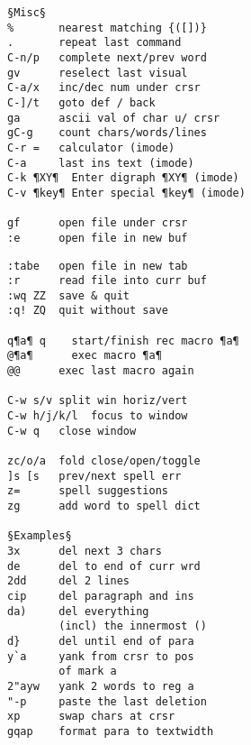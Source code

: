 \documentclass{article}
\begin{document}
\begin{multicols}{4}
\begin{lstlisting}
§Misc§
%       nearest matching {([])}
.       repeat last command
C-n/p   complete next/prev word
gv      reselect last visual
C-a/x   inc/dec num under crsr
C-]/t   goto def / back
ga      ascii val of char u/ crsr
gC-g    count chars/words/lines
C-r =   calculator (imode)
C-a     last ins text (imode)
C-k ¶XY¶  Enter digraph ¶XY¶ (imode)
C-v ¶key¶ Enter special ¶key¶ (imode)

gf      open file under crsr
:e      open file in new buf
\end{lstlisting}
\begin{lstlisting}
:tabe   open file in new tab
:r      read file into curr buf
:wq ZZ  save & quit
:q! ZQ  quit without save

q¶a¶ q    start/finish rec macro ¶a¶
@¶a¶      exec macro ¶a¶
@@      exec last macro again

C-w s/v split win horiz/vert
C-w h/j/k/l  focus to window
C-w q   close window

zc/o/a  fold close/open/toggle
]s [s   prev/next spell err
z=      spell suggestions
zg      add word to spell dict

§Examples§
3x      del next 3 chars
de      del to end of curr wrd
2dd     del 2 lines
cip     del paragraph and ins
da)     del everything
        (incl) the innermost ()
d}      del until end of para
y`a     yank from crsr to pos
        of mark a
2"ayw   yank 2 words to reg a
"-p     paste the last deletion
xp      swap chars at crsr
gqap    format para to textwidth
\end{lstlisting}
\end{multicols}
\end{document}
